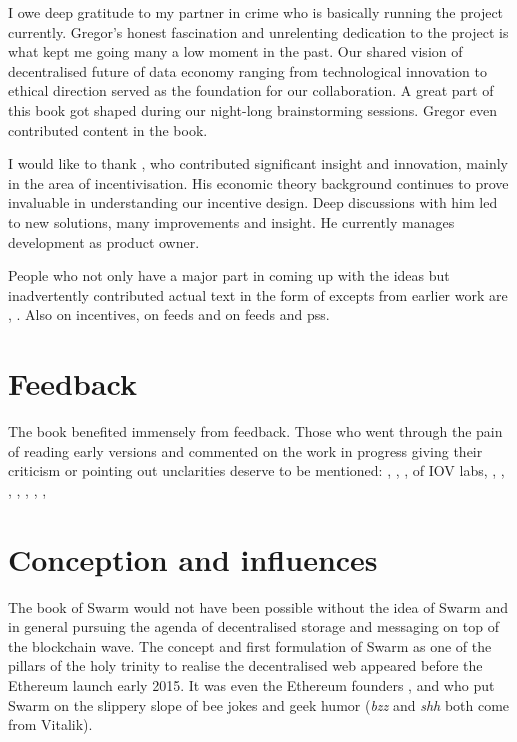 I owe deep gratitude to my partner in crime  who is basically running the project currently. Gregor's honest fascination and unrelenting dedication to the project is what kept me going many a low moment in the past. Our shared vision of decentralised future of data economy ranging from technological innovation to ethical direction served as the foundation for our collaboration. A great part of this book got shaped during our night-long brainstorming sessions. Gregor even contributed content in the book.

I would like to thank , who contributed significant insight and innovation, mainly in the area of incentivisation. His economic theory background continues to prove invaluable in understanding our incentive design. Deep discussions with him led to new solutions, many improvements and insight. He currently manages development as product owner.

People who not only have a major part in coming up with the ideas but inadvertently contributed actual text in the form of excepts from earlier work are , . Also  on incentives,  
 on feeds and  on feeds and pss. 

\section*{Feedback}

The book benefited immensely from feedback. Those who went through the pain of reading early versions and commented on the work in progress giving their criticism or pointing out unclarities deserve to be mentioned: , , ,  of IOV labs, 
, , 
, ,  , , , 



\section*{Conception and influences}

The book of Swarm would not have been possible without the idea of Swarm and in general pursuing the agenda of decentralised storage and messaging on top of the blockchain wave. The concept and first formulation of Swarm as one of the pillars of the holy trinity to realise the decentralised web appeared before the Ethereum launch early 2015. It was even the Ethereum founders ,  and  who put Swarm on the slippery slope of bee jokes and geek humor (\emph{bzz} and \emph{shh} both come from Vitalik). 

